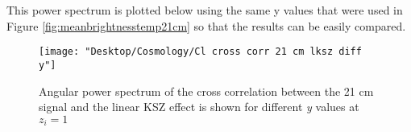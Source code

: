 \documentclass[12pt]{article}
\begin{document}
This power spectrum is plotted below using the same y values that were used in Figure \ref{fig:meanbrightnesstemp21cm} so that the results can be easily compared. 

\begin{figure}[h!]
	\centering
	\texttt{[image: "Desktop/Cosmology/Cl cross corr 21 cm lksz diff y"]}
	\caption{Angular power spectrum of the cross correlation between the 21 cm signal and the linear KSZ effect is shown for different \textit{y} values at $z_i=1$}
	\label{fig:cl-cross-corr-21-cm-lksz-diff-y}
\end{figure}


\end{document}
